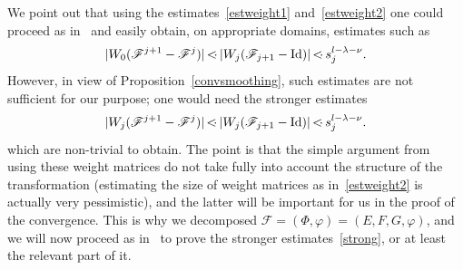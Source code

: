 \documentclass[JEP,XML,SOM,Unicode]{cedram}
\let\mathcal\mathscr
\numberwithin{equation}{section}
\theoremstyle{plain}
\theoremstyle{definition}
\newcommand\MP{\,{<\hspace{-.5em}\cdot}\,}
\begin{document}
We point out that using the estimates~\eqref{estweight1} and~\eqref{estweight2} one could proceed as in~\cite{Pos01} and easily obtain, on appropriate domains, estimates such as
\[ |W_0(\mathcal{F}^{j+1}-\mathcal{F}^{j})| \MP |W_j(\mathcal{F}_{j+1}-\mathrm{Id})|\MP s_j^{l-\lambda-\nu}. \]
However, in view of Proposition~\ref{convsmoothing}, such estimates are not sufficient for our purpose; one would need the stronger estimates
\begin{equation}\label{strong}
|W_j(\mathcal{F}^{j+1}-\mathcal{F}^{j})| \MP |W_j(\mathcal{F}_{j+1}-\mathrm{Id})|\MP s_j^{l-\lambda-\nu}.
\end{equation}
which are non-trivial to obtain. The point is that the simple argument from~\cite{Pos01} using these weight matrices do not take fully into account the structure of the transformation (estimating the size of weight matrices as in~\eqref{estweight2} is actually very pessimistic), and the latter will be important for us in the proof of the convergence. This is why we decomposed $\mathcal{F}=(\Phi,\varphi)=(E,F,G,\varphi)$, and we will now proceed as in~\cite{BF17} to prove the stronger estimates~\eqref{strong}, or at least the relevant part of it.
\end{document}
